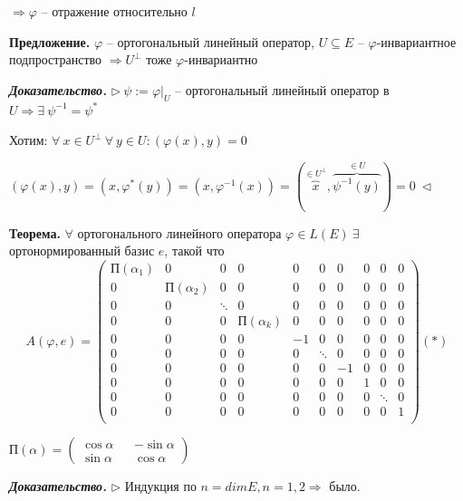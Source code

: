 $\Rightarrow \varphi$ -- отражение относительно $l$

\bigskip
\textbf{Предложение.} $\varphi$ -- ортогональный линейный оператор, $U \subseteq E$ -- $\varphi$-инвариантное подпространство $\Rightarrow U^{\bot}$ тоже $\varphi$-инвариантно

\bigskip
\textbf{\textit{Доказательство.}} $\rhd \ \psi := \varphi|_{U}$ -- ортогональный линейный оператор в $U \Rightarrow \exists \ \psi^{-1} = \psi^*$

Хотим: $\forall \ x \in U^{\bot} \ \forall \ y \in U: (\varphi(x), y) = 0$

$(\varphi(x), y) = (x, \varphi^*(y)) = (x, \varphi^{-1}(x)) = (\overbrace{x}^{\in U^{\bot}}, \overbrace{\psi^{-1}(y)}^{\in U}) = 0 \ \lhd$

\bigskip
\textbf{Теорема.} $\forall$ ортогонального линейного оператора $\varphi \in L(E) \ \exists$ ортонормированный базис $e$, такой что \begin{equation*}A(\varphi, e) = \left(
\begin{array}{c|c|c|c|c|c|c|c|c|c}
  П(\alpha_1) & 0 & 0 & 0 & 0 & 0 & 0 & 0 & 0 & 0  \\
  \hline
  0 & П(\alpha_2) & 0 & 0 & 0 & 0 & 0 & 0 & 0 & 0  \\
  \hline
  0 & 0 & \ddots & 0 & 0 & 0 & 0 & 0 & 0 & 0  \\
  \hline
  0 & 0 & 0 & П(\alpha_k) & 0 & 0 & 0 & 0 & 0 & 0 \\
  \hline
  0 & 0 & 0 & 0 & -1 & 0 & 0 & 0 & 0 & 0 \\
  \hline
  0 & 0 & 0 & 0 & 0 & \ddots & 0 & 0 & 0 & 0 \\
  \hline
  0 & 0 & 0 & 0 & 0 & 0 & -1 & 0 & 0 & 0 \\
  \hline
  0 & 0 & 0 & 0 & 0 & 0 & 0 & 1 & 0 & 0 \\
  \hline
  0 & 0 & 0 & 0 & 0 & 0 & 0 & 0 & \ddots & 0 \\
  \hline
  0 & 0 & 0 & 0 & 0 & 0 & 0 & 0 & 0 & 1 \\
\end{array}
\right) (*)\end{equation*}

$П(\alpha) = \begin{pmatrix} \cos \alpha && -\sin \alpha \\ \sin \alpha && \cos \alpha \end{pmatrix}$

\bigskip
\textbf{\textit{Доказательство.}} $\rhd$ Индукция по $n = dimE, n=1, 2 \Rightarrow$ было.

